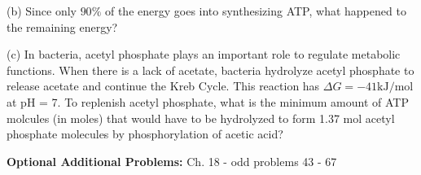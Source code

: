 \documentclass[11pt]{article}
\begin{document}
(b) Since only $90\%$ of the energy goes into synthesizing ATP, what happened to the remaining
energy? 

(c) In bacteria, acetyl phosphate plays an important role to regulate metabolic functions.
When there is a lack of acetate, bacteria hydrolyze acetyl phosphate to release acetate
and continue the Kreb Cycle. This reaction has $\Delta G = -41 \text{kJ/mol}$ at pH = 7. To
replenish acetyl phosphate, what is the minimum amount of ATP molcules (in moles) that would
have to be hydrolyzed to form 1.37 mol acetyl phosphate molecules by phosphorylation of acetic acid?

%
%
%


%
%
%
%
%
%
%


\vfill
\textbf{Optional Additional Problems:} Ch. 18 - odd problems 43 - 67
\end{document}
